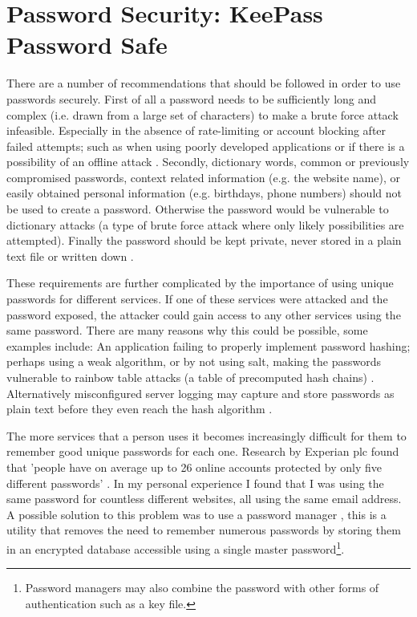 \documentclass[11pt,a4paper]{scrartcl}
\begin{document}
	
\section*{Password Security: KeePass Password Safe}
\begin{refsection}

There are a number of recommendations that should be followed in order to use passwords securely. 
First of all a password needs to be sufficiently long and complex (i.e. drawn from a large set of characters) to make a brute force attack infeasible. Especially in the absence of rate-limiting or account blocking after failed attempts; such as when using poorly developed applications or if there is a possibility of an offline attack \cite{nist_password_2017}.
Secondly, dictionary words, common or previously compromised passwords, context related information (e.g. the website name), or easily obtained personal information (e.g. birthdays, phone numbers) should not be used to create a password. Otherwise the password would be vulnerable to dictionary attacks (a type of brute force attack where only likely possibilities are attempted).
Finally the password should be kept private, never stored in a plain text file or written down \cite{cern_computer_security_information}.

These requirements are further complicated by the importance of using unique passwords for different services. If one of these services were attacked and the password exposed, the attacker could gain access to any other services using the same password. There are many reasons why this could be possible, some examples include: An application failing to properly implement password hashing; perhaps using a weak algorithm, or by not using salt, making the passwords vulnerable to rainbow table attacks (a table of precomputed hash chains) \cite{linkedin_leak}. Alternatively misconfigured server logging may capture and store passwords as plain text before they even reach the hash algorithm  \cite{github_logs,twitter_logs}.

The more services that a person uses it becomes increasingly difficult for them to remember good unique passwords for each one.
Research by Experian plc found that 'people have on average up to 26 online accounts protected by only five different passwords' \cite{experian_2016}.
In my personal experience I found that I was using the same password for countless different websites, all using the same email address. 
A possible solution to this problem was to use a password manager \cite{ncsc_pass_managers}, this is a utility that removes the need to remember numerous passwords by storing them in an encrypted database accessible using a single master password\footnote{Password managers may also combine the password with other forms of authentication such as a key file.}.


\end{refsection}
\end{document}
